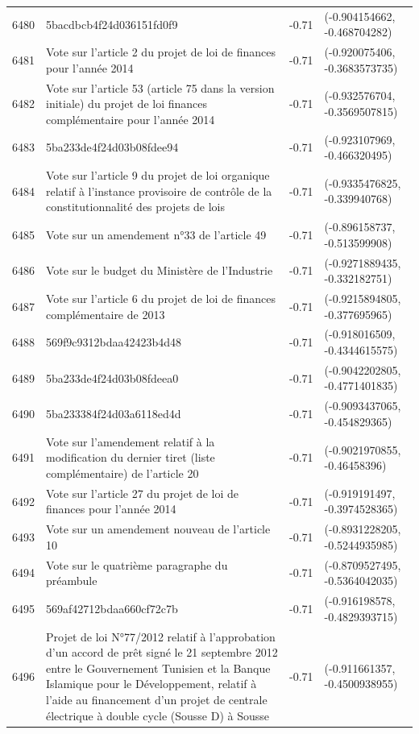 \begin{table}[ht]
\begin{tabular}{rlrl}
  6480 & 5bacdbcb4f24d036151fd0f9 & -0.71 & (-0.904154662, -0.468704282) \\ 
  6481 & Vote sur l'article 2 du projet de loi de finances pour l'année 2014 & -0.71 & (-0.920075406, -0.3683573735) \\ 
  6482 & Vote sur l'article 53 (article 75 dans la version initiale) du projet de loi finances complémentaire pour l'année 2014 & -0.71 & (-0.932576704, -0.3569507815) \\ 
  6483 & 5ba233de4f24d03b08fdee94 & -0.71 & (-0.923107969, -0.466320495) \\ 
  6484 & Vote sur l'article 9 du projet de loi organique relatif à l'instance provisoire de contrôle de la constitutionnalité des projets de lois & -0.71 & (-0.9335476825, -0.339940768) \\ 
  6485 & Vote sur un amendement n°33 de l'article 49 & -0.71 & (-0.896158737, -0.513599908) \\ 
  6486 & Vote sur le budget du Ministère de l'Industrie & -0.71 & (-0.9271889435, -0.332182751) \\ 
  6487 & Vote sur l'article 6 du projet de loi de finances complémentaire de 2013 & -0.71 & (-0.9215894805, -0.377695965) \\ 
  6488 & 569f9c9312bdaa42423b4d48 & -0.71 & (-0.918016509, -0.4344615575) \\ 
  6489 & 5ba233de4f24d03b08fdeea0 & -0.71 & (-0.9042202805, -0.4771401835) \\ 
  6490 & 5ba233384f24d03a6118ed4d & -0.71 & (-0.9093437065, -0.454829365) \\ 
  6491 & Vote sur l'amendement relatif à la modification du dernier tiret (liste complémentaire) de l'article 20 & -0.71 & (-0.9021970855, -0.46458396) \\ 
  6492 & Vote sur l'article 27 du projet de loi de finances pour l'année 2014 & -0.71 & (-0.919191497, -0.3974528365) \\ 
  6493 & Vote sur un amendement nouveau de l'article 10 & -0.71 & (-0.8931228205, -0.5244935985) \\ 
  6494 & Vote sur le quatrième paragraphe du préambule & -0.71 & (-0.8709527495, -0.5364042035) \\ 
  6495 & 569af42712bdaa660cf72c7b & -0.71 & (-0.916198578, -0.4829393715) \\ 
  6496 & Projet de loi N°77/2012 relatif à l'approbation d'un accord de prêt signé le 21 septembre 2012 entre le Gouvernement Tunisien et la Banque Islamique pour le Développement, relatif à l'aide au financement d'un projet de centrale électrique à double cycle (Sousse D) à Sousse & -0.71 & (-0.911661357, -0.4500938955) \\ 

\end{tabular}
\end{table}
